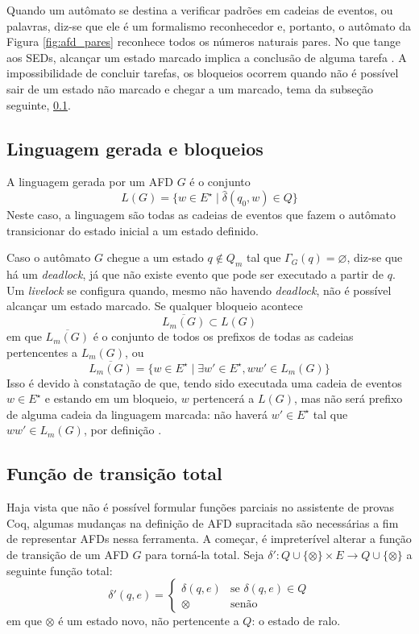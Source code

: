 Quando um autômato se destina a verificar padrões em cadeias de eventos, ou palavras, diz-se que ele é um formalismo reconhecedor \cite{menezes} e, portanto, o autômato da Figura \ref{fig:afd_pares} reconhece todos os números naturais pares. No que tange aos \acs{SED}s, alcançar um estado marcado implica a conclusão de alguma tarefa \cite{cassandras}. A impossibilidade de concluir tarefas, os bloqueios ocorrem quando não é possível sair de um estado não marcado e chegar a um marcado, tema da subseção seguinte, \ref{subsec:ling_ger}.

\subsection{Linguagem gerada e bloqueios}
\label{subsec:ling_ger}

A linguagem gerada por um AFD $G$ é o conjunto $$L(G) = \{ w \in E^\star \mid \hat{\delta}(q_0, w) \in Q \}$$ Neste caso, a linguagem são todas as cadeias de eventos que fazem o autômato transicionar do estado inicial a um estado definido.

Caso o autômato $G$ chegue a um estado $q \not\in Q_m$ tal que $\Gamma_G(q) = \varnothing$, diz-se que há um \textit{deadlock}, já que não existe evento que pode ser executado a partir de $q$. Um \textit{livelock} se configura quando, mesmo não havendo \textit{deadlock}, não é possível alcançar um estado marcado. Se qualquer bloqueio acontece $$\overline{L_m(G)} \subset L(G)$$ em que $\overline{L_m(G)}$ é o conjunto de todos os prefixos de todas as cadeias pertencentes a $L_m(G)$, ou $$\overline{L_m(G)} = \{ w \in E^\star \mid \exists w' \in E^\star, w w' \in L_m(G) \}$$ Isso é devido à constatação de que, tendo sido executada uma cadeia de eventos $w \in E^\star$ e estando em um bloqueio, $w$ pertencerá a $L(G)$, mas não será prefixo de alguma cadeia da linguagem marcada: não haverá $w' \in E^\star$ tal que $ww' \in L_m(G)$, por definição \cite{cassandras}.

\subsection{Função de transição total}

Haja vista que não é possível formular funções parciais no assistente de provas Coq, algumas mudanças na definição de AFD supracitada são necessárias a fim de representar AFDs nessa ferramenta. A começar, é impreterível alterar a função de transição de um AFD $G$ para torná-la total. Seja $\delta' : Q \cup \{ \otimes \} \times E \to Q \cup \{ \otimes \}$ a seguinte função total: $$\delta'(q, e) = \begin{cases}
\delta(q, e) & \text{se $\delta(q, e) \in Q$} \\
\otimes & \text{senão}
\end{cases}$$ em que $\otimes$ é um estado novo, não pertencente a $Q$: o estado de ralo.

